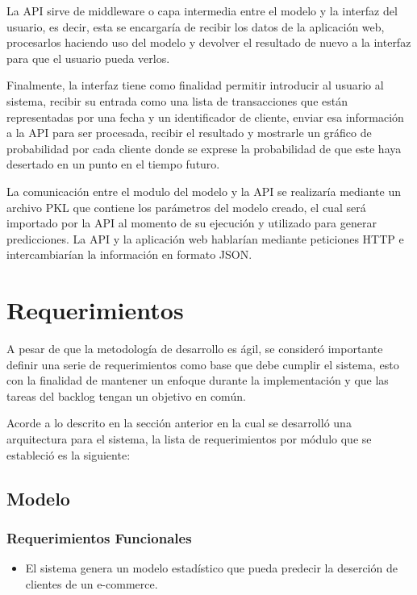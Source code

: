	La API sirve de middleware o capa intermedia entre el modelo y la interfaz del usuario, es decir, esta se encargaría de recibir los datos de la aplicación web, procesarlos haciendo uso del modelo y devolver el resultado de nuevo a la interfaz para que el usuario pueda verlos.

	Finalmente, la interfaz tiene como finalidad permitir introducir al usuario al sistema, recibir su entrada como una lista de transacciones que están representadas por una fecha y un identificador de cliente, enviar esa información a la API para ser procesada, recibir el resultado y mostrarle un gráfico de probabilidad por cada cliente donde se exprese la probabilidad de que este haya desertado en un punto en el tiempo futuro.
	
	La comunicación entre el modulo del modelo y la API se realizaría mediante un archivo PKL que contiene los parámetros del modelo creado, el cual será importado por la API al momento de su ejecución y utilizado para generar predicciones. La API y la aplicación web hablarían mediante peticiones HTTP e intercambiarían la información en formato JSON.

\section{Requerimientos}

A pesar de que la metodología de desarrollo es ágil, se consideró importante definir una serie de requerimientos como base que debe cumplir el sistema, esto con la finalidad de mantener un enfoque durante la implementación y que las tareas del backlog tengan un objetivo en común.

	Acorde a lo descrito en la sección anterior en la cual se desarrolló una arquitectura para el sistema, la lista de requerimientos por módulo que se estableció es la siguiente: 

\subsection{Modelo}

\subsubsection{Requerimientos Funcionales}

\begin{itemize}
	\item El sistema genera un modelo estadístico que pueda predecir la deserción de clientes de un e-commerce.
\end{itemize}


